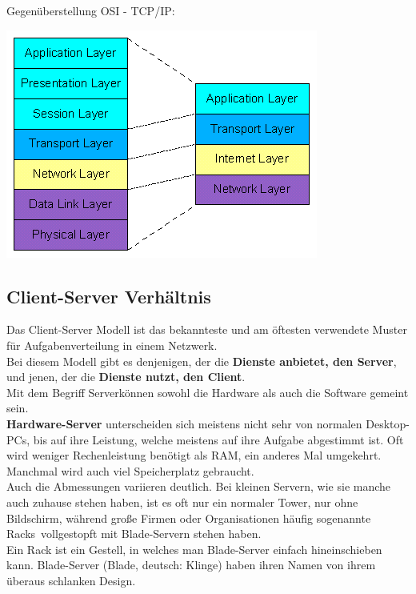 \documentclass[12pt,a4paper]{report}
\begin{document}
Gegenüberstellung OSI - TCP/IP:\\
\begin{center}
\includegraphics[scale=0.7]{../docs/tarkes/pics/ositcpip.png}
\end{center}
\subsection{Client-Server Verhältnis}
Das Client-Server Modell ist das bekannteste und am öftesten verwendete Muster für Aufgabenverteilung in einem Netzwerk.\\ 
Bei diesem Modell gibt es denjenigen, der die \textbf{Dienste anbietet, den Server}, und jenen, der die \textbf{Dienste nutzt, den Client}.\\

Mit dem Begriff \glqq Server\grqq können sowohl die Hardware als auch die Software gemeint sein.\\

\textbf{Hardware-Server} unterscheiden sich meistens nicht sehr von normalen Desktop-PCs, bis auf ihre Leistung, welche meistens auf ihre Aufgabe abgestimmt ist. Oft wird weniger Rechenleistung benötigt als RAM, ein anderes Mal umgekehrt. Manchmal wird auch viel Speicherplatz gebraucht.\\
Auch die Abmessungen variieren deutlich. Bei kleinen Servern, wie sie manche auch zuhause stehen haben, ist es oft nur ein normaler Tower, nur ohne Bildschirm, während große Firmen oder Organisationen häufig sogenannte \glqq Racks\grqq \ vollgestopft mit Blade-Servern stehen haben.\\
Ein Rack ist ein Gestell, in welches man Blade-Server einfach hineinschieben kann. Blade-Server (Blade, deutsch: Klinge) haben ihren Namen von ihrem überaus schlanken Design.\\
\end{document}
